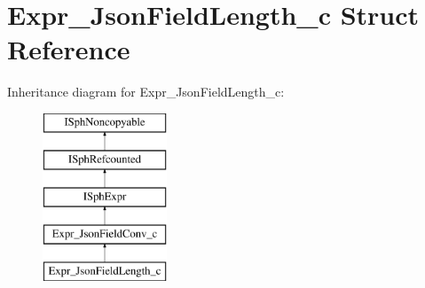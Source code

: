 \hypertarget{structExpr__JsonFieldLength__c}{\section{Expr\-\_\-\-Json\-Field\-Length\-\_\-c Struct Reference}
\label{structExpr__JsonFieldLength__c}
}
Inheritance diagram for Expr\-\_\-\-Json\-Field\-Length\-\_\-c\-:\begin{figure}[H]
\begin{center}
\leavevmode
\includegraphics[height=5.000000cm]{structExpr__JsonFieldLength__c}
\end{center}
\end{figure}
